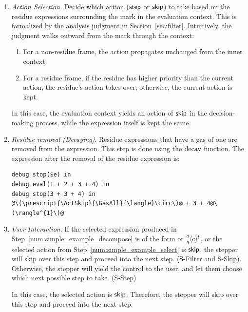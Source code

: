\begin{enumerate}
\item \emph{Action Selection}. \label{num:simple_example_select} Decide
  which action (\(\ActStep\) or \(\ActSkip\)) to take based on the
  residue expressions surrounding the mark in the evaluation context.
  This is formalized by the analysis judgment
   in
  Section~\ref{sec:filter}. Intuitively, the judgment walks outward
  from the mark through the context:

  \begin{enumerate}
  \item For a non-residue frame, the action propagates unchanged from
    the inner context.
  \item For a residue frame, if the residue has higher priority than
    the current action, the residue's action takes over; otherwise,
    the current action is kept.
  \end{enumerate}

  In this case, the evaluation context yields an action of
  \(\ActSkip\) in the decision-making process, while the expression
  itself is kept the same.

\item \emph{Residue removal (Decaying)}. Residue expressions that
  have a gas of one are removed from the expression. This step is
  done using the \(\Decay\) function. The expression after the removal
  of the residue expression is:
  \begin{lstlisting}[language=hazel,caption={Evaluation context after decaying},label={lst:simple_example_decay}]
debug stop($e) in
debug eval(1 + 2 + 3 + 4) in
debug stop(3 + 3 + 4) in
@\(\prescript{\ActSkip}{\GasAll}{\langle}\circ\)@ + 3 + 4@\(\rangle^{1}\)@\end{lstlisting}

\item \emph{User Interaction}. If the selected expression produced in
  Step~\ref{num:simple_example_decompose} is of the form
   or
  \(\Residue{a}{g}{l}{e}\), or the selected action from
  Step~\ref{num:simple_example_select} is \(\ActSkip\), the stepper
  will skip over this step and proceed into the next step. (S-Filter and
  S-Skip). Otherwise, the stepper will yield the control to the user,
  and let them choose which next possible step to take. (S-Step)

  In this case, the selected action is \(\ActSkip\). Therefore, the stepper
  will skip over this step and proceed into the next step.


\end{enumerate}
